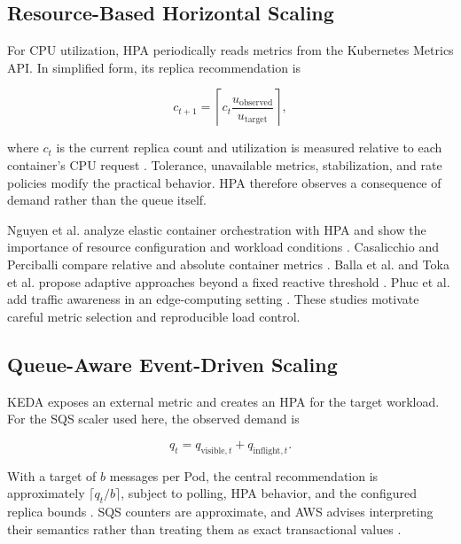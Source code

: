 \documentclass[conference]{IEEEtran}
\begin{document}
\subsection{Resource-Based Horizontal Scaling}

For CPU utilization, HPA periodically reads metrics from the Kubernetes Metrics
API. In simplified form, its replica recommendation is

\begin{equation}
  c_{t+1}=\left\lceil c_t
  \frac{u_{\mathrm{observed}}}{u_{\mathrm{target}}}\right\rceil,
\end{equation}

where $c_t$ is the current replica count and utilization is measured relative
to each container's CPU request \cite{KubernetesHPA}. Tolerance, unavailable
metrics, stabilization, and rate policies modify the practical behavior. HPA
therefore observes a consequence of demand rather than the queue itself.

Nguyen et al. analyze elastic container orchestration with HPA and show the
importance of resource configuration and workload conditions
\cite{Nguyen2020HPA}. Casalicchio and Perciballi compare relative and absolute
container metrics \cite{Casalicchio2017Metrics}. Balla et al. and Toka et al.
propose adaptive approaches beyond a fixed reactive threshold
\cite{Balla2020Adaptive,Toka2020Adaptive}. Phuc et al. add traffic awareness in
an edge-computing setting \cite{Phuc2022TrafficAware}. These studies motivate
careful metric selection and reproducible load control.

\subsection{Queue-Aware Event-Driven Scaling}

KEDA exposes an external metric and creates an HPA for the target workload. For
the SQS scaler used here, the observed demand is

\begin{equation}
  q_t = q_{\mathrm{visible},t} + q_{\mathrm{inflight},t}.
\end{equation}

With a target of $b$ messages per Pod, the central recommendation is
approximately $\lceil q_t/b \rceil$, subject to polling, HPA behavior, and the
configured replica bounds \cite{KEDASQS}. SQS counters are approximate, and AWS
advises interpreting their semantics rather than treating them as exact
transactional values \cite{AWSSQSMetrics}.
\end{document}
